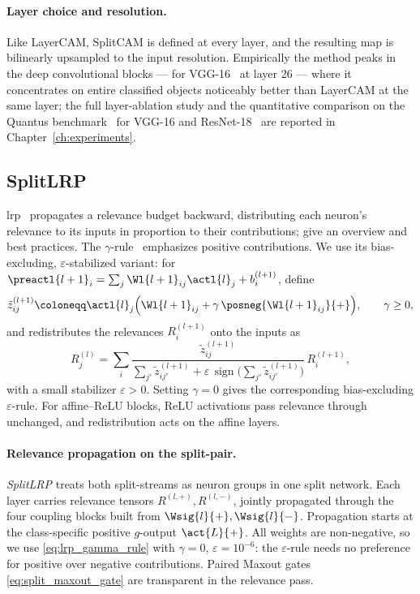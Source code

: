 \paragraph{Layer choice and resolution.}
Like LayerCAM, SplitCAM is defined at every layer, and the resulting map is bilinearly upsampled to the input resolution. Empirically the method peaks in the deep convolutional blocks --- for VGG-16~\parencite{Simonyan2015} at layer 26 --- where it concentrates on entire classified objects noticeably better than LayerCAM at the same layer; the full layer-ablation study and the quantitative comparison on the Quantus benchmark~\parencite{Hedstrom2023} for VGG-16 and ResNet-18~\parencite{He2016resnet} are reported in Chapter~\ref{ch:experiments}.

\subsection{SplitLRP}\label{sec:split_lrp}

\ac{lrp}~\parencite{Bach2015} propagates a relevance budget backward, distributing each neuron's relevance to its inputs in proportion to their contributions; \textcite{Montavon2018} give an overview and \textcite{Kohlbrenner2020} best practices. The $\gamma$-rule~\parencite{Montavon_2022_gammaLRP} emphasizes positive contributions. We use its bias-excluding, $\varepsilon$-stabilized variant: for $\preactl{l+1}_i=\sum_j\Wl{l+1}_{ij}\actl{l}_j+b^{(l+1)}_i$, define
\begin{equation}
	\tilde{z}^{(l+1)}_{ij} \coloneqq \actl{l}_j \Bigl( \Wl{l+1}_{ij} + \gamma\, \posneg{\Wl{l+1}_{ij}}{+} \Bigr),
	\qquad \gamma \geq 0,
	\label{eq:gamma_contribution}
\end{equation}
and redistributes the relevances $R^{(l+1)}_i$ onto the inputs as
\begin{equation}
	R^{(l)}_j = \sum_i \frac{\tilde{z}^{(l+1)}_{ij}}{\sum_{j'} \tilde{z}^{(l+1)}_{ij'} + \varepsilon \, \operatorname{sign}\bigl( \sum_{j'} \tilde{z}^{(l+1)}_{ij'} \bigr)} \, R^{(l+1)}_i,
	\label{eq:lrp_gamma_rule}
\end{equation}
with a small stabilizer $\varepsilon > 0$. Setting $\gamma = 0$ gives the corresponding bias-excluding $\varepsilon$-rule. For affine--ReLU blocks, ReLU activations pass relevance through unchanged, and redistribution acts on the affine layers.

\paragraph{Relevance propagation on the split-pair.}\label{subsec:splitlrp_definition}
\emph{SplitLRP} treats both split-streams as neuron groups in one split network. Each layer carries relevance tensors $R^{(l,+)},R^{(l,-)}$, jointly propagated through the four coupling blocks built from $\Wsig{l}{+},\Wsig{l}{-}$. Propagation starts at the class-specific positive $g$-output $\act{L}{+}$. All weights are non-negative, so we use \eqref{eq:lrp_gamma_rule} with $\gamma=0$, $\varepsilon=10^{-6}$: the $\varepsilon$-rule needs no preference for positive over negative contributions. Paired Maxout gates \eqref{eq:split_maxout_gate} are transparent in the relevance pass.

